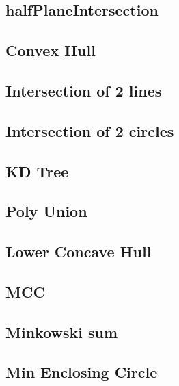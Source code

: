 \documentclass[10pt,twocolumn,oneside]{article}
\begin{document}
\subsection{halfPlaneIntersection}

% 

\subsection{Convex Hull}


\subsection{Intersection of 2 lines}


\subsection{Intersection of 2 circles}


\subsection{KD Tree}


\subsection{Poly Union}


\subsection{Lower Concave Hull}


\subsection{MCC}


\subsection{Minkowski sum}


\subsection{Min Enclosing Circle}

\end{document}
